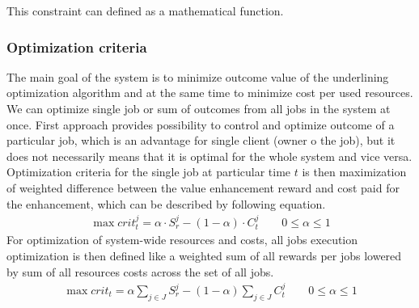 This constraint can defined as a mathematical function.

\subsubsection{Optimization criteria}
The main goal of the system is to minimize outcome value of the underlining optimization algorithm
and at the same time to minimize cost per used resources.
We can optimize single job or sum of outcomes from all jobs in the system at once.
First approach provides possibility to control and optimize outcome of a particular job,
which is an advantage for single client (owner o the job),
but it does not necessarily means that it is optimal for the whole system and vice versa.
Optimization criteria for the single job at particular time $t$ is then
maximization of weighted difference between the value enhancement reward 
and cost paid for the enhancement,
which can be described by following equation.
\begin{align*}
	\max crit_{t}^{j} = \alpha \cdot S_{r}^{j} - (1 - \alpha) \cdot C_{t}^{j} \qquad 0 \leq \alpha \leq 1 
\end{align*}
For optimization of system-wide resources and costs,
all jobs execution optimization is then defined like a
weighted sum of all rewards per jobs lowered by sum of all resources costs across the set of all jobs.
\begin{align*}
	\max crit_{t} = \alpha \sum_{j \in J} S_{r}^{j} - (1 - \alpha) \sum_{j \in J} C_{t}^{j} \qquad 0 \leq \alpha \leq 1 
\end{align*}
